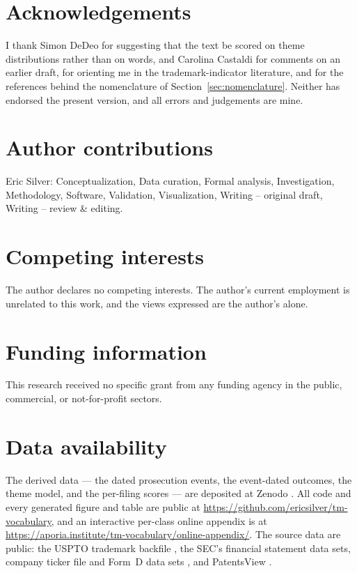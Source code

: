 \section*{Acknowledgements}
I thank Simon DeDeo for suggesting that the text be scored on theme
distributions rather than on words, and Carolina Castaldi for comments
on an earlier draft, for orienting me in the trademark-indicator
literature, and for the references behind the nomenclature of
Section~\ref{sec:nomenclature}. Neither has endorsed the present
version, and all errors and judgements are mine.

\section*{Author contributions}
Eric Silver: Conceptualization, Data curation, Formal analysis,
Investigation, Methodology, Software, Validation, Visualization,
Writing -- original draft, Writing -- review \& editing.

\section*{Competing interests}
The author declares no competing interests. The author's current
employment is unrelated to this work, and the views expressed are the
author's alone.

\section*{Funding information}
This research received no specific grant from any funding agency in the
public, commercial, or not-for-profit sectors.

\section*{Data availability}
The derived data --- the dated prosecution events, the event-dated
outcomes, the theme model, and the per-filing scores --- are deposited
at Zenodo \citep{SilverData2026}. All code and every generated figure
and table are public at \url{https://github.com/ericsilver/tm-vocabulary},
and an interactive per-class online appendix is at
\url{https://aporia.institute/tm-vocabulary/online-appendix/}. The source
data are public: the USPTO trademark backfile \citep{USPTOtrtyrap}, the
SEC's financial statement data sets, company ticker file and Form~D data
sets \citep{SECfsds, SECtickers, SECformd}, and PatentsView
\citep{PatentsView}.

